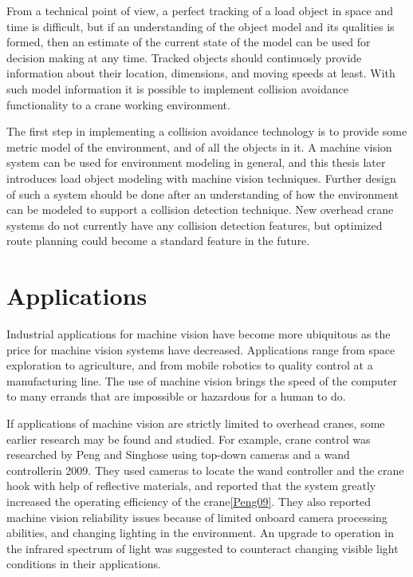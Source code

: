 \documentclass[12pt,a4paper,oneside,pdftex]{report}
\begin{document}
From a technical point of view, a perfect tracking of a load object in space and time is difficult, but if an understanding of the object model and its qualities is formed, then an estimate of the current state of the model can be used for decision making at any time. Tracked objects should continuosly provide information about their location, dimensions, and moving speeds at least. With such model information it is possible to implement collision avoidance functionality to a crane working environment.

The first step in implementing a collision avoidance technology is to provide some metric model of the environment, and of all the objects in it. A machine vision system can be used for environment modeling in general, and this thesis  later introduces load object modeling with machine vision techniques. Further design of such a system should be done  after an understanding of how the environment can be modeled to support a collision detection technique. New overhead crane systems do not currently have any collision detection features, but optimized route planning could become a standard feature in the future.
 
\section{Applications}

Industrial applications for machine vision have become more ubiquitous as the price for machine vision systems have decreased. Applications range from space exploration to agriculture, and from mobile robotics to quality control at a manufacturing line. The use of machine vision brings the speed of the computer to many errands that are impossible or hazardous for a human to do.

If applications of machine vision are strictly limited to overhead cranes, some earlier research may be found and studied. For example, crane control was researched by Peng and Singhose using top-down cameras and a wand controllerin 2009. They used cameras to locate the wand controller and the crane hook with help of reflective materials, and reported that the system greatly increased the operating efficiency of the crane\ref{Peng09}. They also reported machine vision reliability issues because of limited onboard camera processing abilities, and changing lighting in the environment. An upgrade to operation in the infrared spectrum of light was suggested to counteract changing visible light conditions in their applications.
\end{document}
